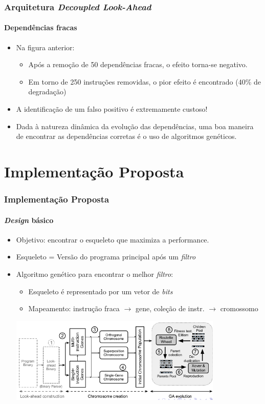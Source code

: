 \documentclass[10pt]{beamer}
\begin{document}
\begin{frame}
\frametitle{Arquitetura \textit{Decoupled Look-Ahead}}
\framesubtitle{Dependências fracas}

\begin{itemize}
 \item Na figura anterior:
 \begin{itemize}
   \item Após a remoção de 50 dependências fracas, o efeito torna-se negativo.
   \item Em torno de 250 instruções removidas, o pior efeito é encontrado (40\%
   de degradação)
 \end{itemize}
 
 \item A identificação de um falso positivo é extremamente custoso! 
 
 \vspace{12pt}
 
 \item Dada à natureza dinâmica da evolução das dependências, uma boa maneira
 de encontrar as dependências corretas é o uso de algoritmos genéticos.
\end{itemize}
\end{frame}

\section {Implementação Proposta}

\begin{frame}
\frametitle{Implementação Proposta}
\framesubtitle{\textit{Design} básico}

\begin{itemize}
 \item Objetivo: encontrar o esqueleto que maximiza a performance.
 \item Esqueleto = Versão do programa principal após um \textit{filtro}
 \item Algoritmo genético para encontrar o melhor \textit{filtro}:
 \begin{itemize}
   \item Esqueleto é representado por um vetor de \textit{bits}
   \item Mapeamento: instrução fraca \(\rightarrow\) gene, coleção de instr.
   \(\rightarrow\) cromossomo
 \end{itemize}
 
 \vspace{12pt}
 \centering
\includegraphics[width=0.8\textwidth]{images/evol}
\end{itemize}
\end{frame}
\end{document}
